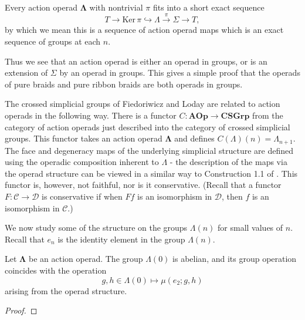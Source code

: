 \documentclass{amsbook} %
\newcommand{\ML}{\mathbf{\Lambda}}
\numberwithin{section}{chapter}
\begin{document}
\begin{cor}\label{extension}
Every action operad $\ML$ with nontrivial $\pi$ fits into a short exact sequence
\[
T \to \textrm{Ker}\,\pi \hookrightarrow \Lambda \stackrel{\pi}{\longrightarrow} \Sigma \to T,
\]
by which we mean this is a sequence of action operad maps which is an exact sequence of groups at each $n$.
\end{cor}

\begin{rem}
Thus we see that an action operad is either an operad in groups, or is an extension of $\Sigma$ by an operad in groups. This gives a simple proof that the operads of pure braids and pure ribbon braids are both operads in groups.
\end{rem}

\begin{rem}
The crossed simplicial groups of Fiedoriwicz and Loday \cite{FL91} are related to action operads in the following way. There is a functor $C \colon \mathbf{AOp} \rightarrow \mathbf{CSGrp}$ from the category of action operads just described into the category of crossed simplicial groups. This functor takes an action operad $\ML$ and defines $C(\Lambda)(n) = \Lambda_{n+1}$. The face and degeneracy maps of the underlying simplicial structure are defined using the operadic composition inherent to $\Lambda$ - the description of the maps via the operad structure can be viewed in a similar way to Construction 1.1 of \cite{Kra96}. This functor is, however, not faithful, nor is it conservative. (Recall that a functor $F \colon \mathcal{C} \rightarrow \mathcal{D}$ is conservative if when $Ff$ is an isomorphism in $\mathcal{D}$, then $f$ is an isomorphism in $\mathcal{C}$.)
\end{rem}

We now study some of the structure on the groups $\Lambda(n)$ for small values of $n$. Recall that $e_{n}$ is the identity element in the group $\Lambda(n)$.

\begin{lem}\label{G0abel}
Let $\ML$ be an action operad. The group $\Lambda(0)$ is abelian, and its group operation coincides with the operation 
\[
g, h \in \Lambda(0) \mapsto \mu(e_2; g, h)
\]
arising from the operad structure.
\end{lem}
\begin{proof}

\end{proof}
\end{document}
